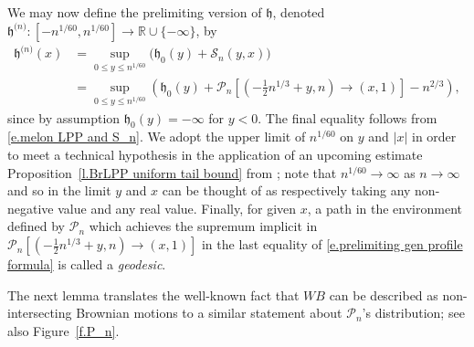 \documentclass[oneside,final,11pt]{amsart}
\makeatletter
\theoremstyle{definition}
\newcounter{assum}
\renewcommand{\L}{\CP}
\newcommand{\WB}{W\!B}
\newcommand{\fh}{\mathfrak{h}}
\newcommand{\h}{\fh^{{\scriptscriptstyle(}n{\scriptscriptstyle)}}}
\newcommand*\bigcdot{\mathpalette\bigcdot@{.5}}
\newcommand*\bigcdot@[2]{\mathbin{\vcenter{\hbox{\scalebox{#2}{$\m@th#1\bullet$}}}}}
\newcommand{\R}{\mathbb{R}}
\newcommand{\CS}{\mathcal{S}}
\renewcommand{\S}{\CS}
\newcommand{\1}[1]{\mathbf{1}_{#1}}
\newcommand{\hlim}{\mathfrak{h}}
\newcommand{\CP}{\mathcal{P}}
\numberwithin{equation}{section}
\makeatother
\begin{document}
 We may now define the prelimiting version of $\hlim$, denoted $\h:[-n^{1/60}, n^{1/60}] \to \R\cup\{-\infty\}$, by
%
\begin{equation}\label{e.prelimiting gen profile formula}
\begin{split}
\h(x) &= \sup_{0 \leq y \leq n^{1/60}} \Big(\hlim_0(y) + \S_n(y, x)\Big) \\
%
%
&=\sup_{0 \leq y \leq n^{1/60}} \left(\hlim_0(y) + \L_n[(-\tfrac{1}{2}n^{1/3}+y, n) \to (x, 1)] - n^{2/3}\right),
\end{split}
\end{equation}
%
since by assumption $\fh_0(y) = -\infty$ for $y< 0$.
The final equality follows from \eqref{e.melon LPP and S_n}. We adopt the upper limit of $n^{1/60}$ on $y$ and $|x|$ in order to meet a technical hypothesis in the application of an upcoming estimate Proposition~\ref{l.BrLPP uniform tail bound}  from \cite{LPPtools}; note that $n^{1/60}\to\infty$ as $n\to\infty$ and so in the limit $y$ and $x$ can be thought of as respectively taking any non-negative value and any real value.
Finally, for given $x$, a path in the environment defined by $\L_n$ which achieves the supremum implicit in $\L_n[(-\tfrac{1}{2}n^{1/3}+y, n) \to (x, 1)]$ in the last equality of \eqref{e.prelimiting gen profile formula} is called a \emph{geodesic}.

%
%
The next lemma translates the well-known fact that $\WB$ can be described as non-intersecting Brownian motions to a similar statement about $\L_n$'s distribution; see also Figure~\ref{f.P_n}.
\end{document}
